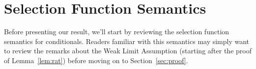\documentclass[12pt]{article}
\begin{document}




\section{Selection Function Semantics}
\label{sec:sem}

Before presenting our result, we'll start by reviewing the selection function semantics for conditionals. 
Readers familiar with this semantics may simply want to review the remarks about the Weak Limit Assumption (starting after the proof of Lemma~\ref{lem:rat}) before moving on to Section~\ref{sec:proof}. 
\end{document}
